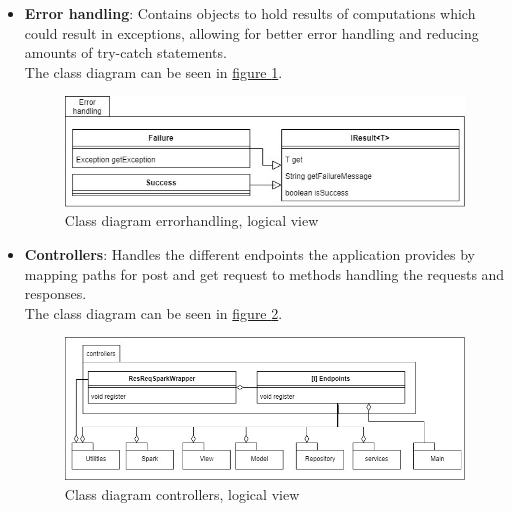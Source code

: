 \begin{itemize}
    \item \textbf{Error handling}: Contains objects to hold results of computations which could result in exceptions, allowing for better error handling and reducing amounts of try-catch statements. \\
    The class diagram can be seen in \hyperref[fig:classDiagramErrorhandling]{figure \ref{fig:classDiagramErrorhandling}}.
    \begin{figure}[H]
        \centering
        \includegraphics[width=1.0\textwidth]{images/class_diagram_errorhandling.jpg}
        \caption{Class diagram errorhandling, logical view}
        \label{fig:classDiagramErrorhandling}
    \end{figure}
    
    \item \textbf{Controllers}: Handles the different endpoints the application provides by mapping paths for post and get request to methods handling the requests and responses.\\
    The class diagram can be seen in \hyperref[fig:classDiagramControllers]{figure \ref{fig:classDiagramControllers}}.
    \begin{figure}[H]
        \centering
        \includegraphics[width=1.0\textwidth]{images/class_diagram_controllers.jpg}
        \caption{Class diagram controllers, logical view}
        \label{fig:classDiagramControllers}
    \end{figure}
    

\end{itemize}
